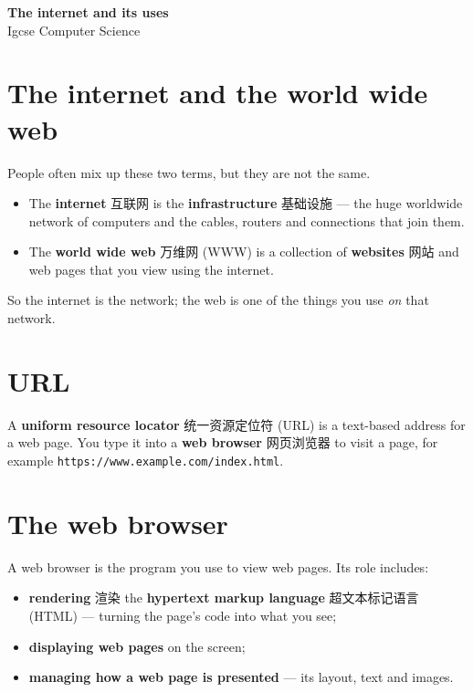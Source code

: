 \documentclass[11pt]{article}
\begin{document}
\begin{center}
  {\LARGE\bfseries The internet and its uses}\\[0.35em]
  {\large Igcse Computer Science}
\end{center}
\vspace{0.6em}

\section*{The internet and the world wide web}

People often mix up these two terms, but they are not the same.

\begin{itemize}
\item The \textbf{internet} 互联网 is the \textbf{infrastructure} 基础设施 — the huge worldwide network of computers and the cables, routers and connections that join them.

\item The \textbf{world wide web} 万维网 (WWW) is a collection of \textbf{websites} 网站 and web pages that you view using the internet.

\end{itemize}

So the internet is the network; the web is one of the things you use \emph{on} that network.

\section*{URL}

A \textbf{uniform resource locator} 统一资源定位符 (URL) is a text-based address for a web page. You type it into a \textbf{web browser} 网页浏览器 to visit a page, for example \texttt{https://www.example.com/index.html}.

\section*{The web browser}

A web browser is the program you use to view web pages. Its role includes:

\begin{itemize}
\item \textbf{rendering} 渲染 the \textbf{hypertext markup language} 超文本标记语言 (HTML) — turning the page's code into what you see;

\item \textbf{displaying web pages} on the screen;

\item \textbf{managing how a web page is presented} — its layout, text and images.

\end{itemize}
\end{document}
